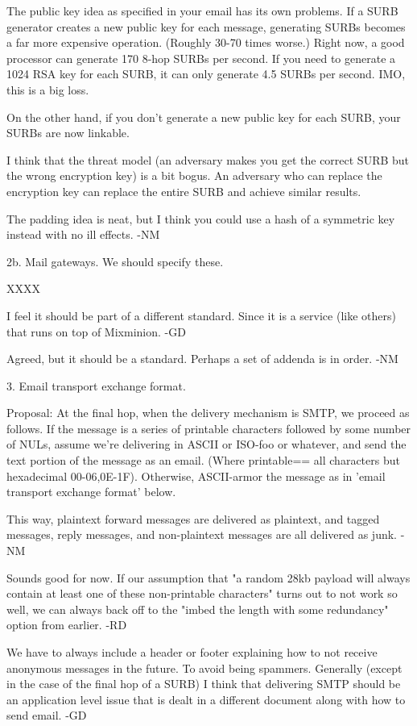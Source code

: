    The public key idea as specified in your email has its own
   problems.  If a SURB generator creates a new public key for each
   message, generating SURBs becomes a far more expensive operation.
   (Roughly 30-70 times worse.)  Right now, a good processor can
   generate 170 8-hop SURBs per second.  If you need to generate a
   1024 RSA key for each SURB, it can only generate 4.5 SURBs per
   second.  IMO, this is a big loss.

   On the other hand, if you don't generate a new public key for each
   SURB, your SURBs are now linkable.

   I think that the threat model (an adversary makes you get the 
   correct SURB but the wrong encryption key) is a bit bogus.  An
   adversary who can replace the encryption key can replace the entire
   SURB and achieve similar results. 

   The padding idea is neat, but I think you could use a hash of a
   symmetric key instead with no ill effects.  -NM

2b. Mail gateways. We should specify these.

   XXXX

   I feel it should be part of a different standard. Since it is a
   service (like others) that runs on top of Mixminion. -GD

   Agreed, but it should be a standard.  Perhaps a set of addenda is
   in order. -NM

3. Email transport exchange format.

   Proposal: At the final hop, when the delivery mechanism is SMTP, we
   proceed as follows.  If the message is a series of printable
   characters followed by some number of NULs, assume we're
   delivering in ASCII or ISO-foo or whatever, and send the text
   portion of the message as an email.   (Where printable==
   {all characters but hexadecimal 00-06,0E-1F}).  Otherwise,
   ASCII-armor the message as in 'email transport exchange format'
   below.

   This way, plaintext forward messages are delivered as plaintext,
   and tagged messages, reply messages, and non-plaintext messages are
   all delivered as junk. -NM

   Sounds good for now. If our assumption that "a random 28kb payload
   will always contain at least one of these non-printable characters"
   turns out to not work so well, we can always back off to the "imbed
   the length with some redundancy" option from earlier. -RD

   We have to always include a header or footer explaining how to not
   receive anonymous messages in the future. To avoid being
   spammers. Generally (except in the case of the final hop of a SURB)
   I think that delivering SMTP should be an application level issue
   that is dealt in a different document along with how to send
   email. -GD

